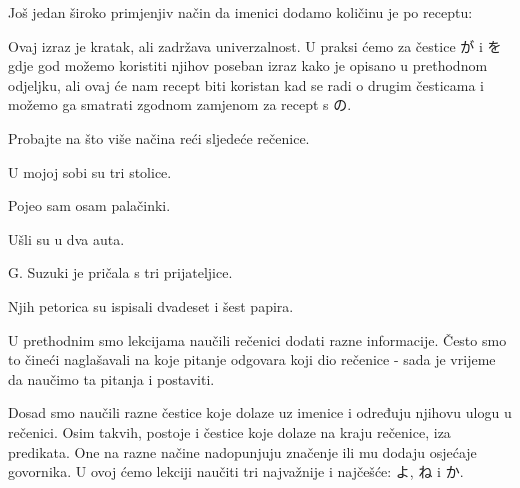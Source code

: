 	
	Još jedan široko primjenjiv način da imenici dodamo količinu je po receptu:
	
	
	Ovaj izraz je kratak, ali zadržava univerzalnost. U praksi ćemo za čestice が i を gdje god možemo koristiti njihov poseban izraz kako je opisano u prethodnom odjeljku, ali ovaj će nam recept biti koristan kad se radi o drugim česticama i možemo ga smatrati zgodnom zamjenom za recept s の.
	
	\begin{reibun}
	\end{reibun}

	
	
	\begin{mondai}{Probajte na što više načina reći sljedeće rečenice.}
		\item U mojoj sobi su tri stolice.
		\item Pojeo sam osam palačinki.
		\item Ušli su u dva auta.
		\item G. Suzuki je pričala s tri prijateljice.
		\item Njih petorica su ispisali dvadeset i šest papira.
	\end{mondai}
\newpage
{}

	
	U prethodnim smo lekcijama naučili rečenici dodati razne informacije. Često smo to čineći naglašavali na koje pitanje odgovara koji dio rečenice - sada je vrijeme da naučimo ta pitanja i postaviti.
	
	
	Dosad smo naučili razne čestice koje dolaze uz imenice i određuju njihovu ulogu u rečenici. Osim takvih, postoje i čestice koje dolaze na kraju rečenice, iza predikata. One na razne načine nadopunjuju značenje ili mu dodaju osjećaje govornika. U ovoj ćemo lekciji naučiti tri najvažnije i najčešće: よ, ね i か.
	
